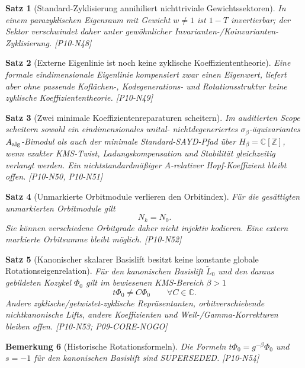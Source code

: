 \documentclass[11pt,a4paper]{amsart}
\newtheorem{theorem}{Satz}[section]
\newtheorem{remark}[theorem]{Bemerkung}
\begin{document}
\begin{theorem}[Standard-Zyklisierung annihiliert nichttriviale
Gewichtssektoren]\label{thm:n48}
In einem parazyklischen Eigenraum mit Gewicht $w\ne1$ ist $1-T$ invertierbar;
der Sektor verschwindet daher unter gewöhnlicher Invarianten-/Koinvarianten-
Zyklisierung. \emph{[P10-N48]}
\end{theorem}

\begin{theorem}[Externe Eigenlinie ist noch keine zyklische
Koeffiziententheorie]\label{thm:n49}
Eine formale eindimensionale Eigenlinie kompensiert zwar einen Eigenwert,
liefert aber ohne passende Koflächen-, Kodegenerations- und Rotationsstruktur
keine zyklische Koeffiziententheorie. \emph{[P10-N49]}
\end{theorem}

\begin{theorem}[Zwei minimale Koeffizientenreparaturen scheitern]
\label{thm:n50n51}
Im auditierten Scope scheitern sowohl ein eindimensionales unital-
nichtdegeneriertes $\sigma_\beta$-äquivariantes $A_{\rm alg}$-Bimodul als auch
der minimale Standard-SAYD-Pfad über $H_\beta=\mathbb C[\mathbb Z]$, wenn
exakter KMS-Twist, Ladungskompensation und Stabilität gleichzeitig verlangt
werden. Ein nichtstandardmäßiger $A$-relativer Hopf-Koeffizient bleibt offen.
\emph{[P10-N50, P10-N51]}
\end{theorem}

\begin{theorem}[Unmarkierte Orbitmodule verlieren den Orbitindex]
\label{thm:n52}
Für die gesättigten unmarkierten Orbitmodule gilt
\[
  N_k=N_0.
\]
Sie können verschiedene Orbitgrade daher nicht injektiv kodieren. Eine extern
markierte Orbitsumme bleibt möglich. \emph{[P10-N52]}
\end{theorem}

\begin{theorem}[Kanonischer skalarer Basislift besitzt keine konstante globale
Rotationseigenrelation]\label{thm:n53}
Für den kanonischen Basislift $\widetilde L_0$ und den daraus gebildeten
Kozykel $\Phi_0$ gilt im bewiesenen KMS-Bereich $\beta>1$
\[
  \boxed{t\Phi_0\ne C\Phi_0\qquad\forall C\in\mathbb C.}
\]
Andere zyklische/getwistet-zyklische Repräsentanten, orbitverschiebende
nichtkanonische Lifts, andere Koeffizienten und Weil-/Gamma-Korrekturen bleiben
offen. \emph{[P10-N53; P09-CORE-NOGO]}
\end{theorem}

\begin{remark}[Historische Rotationsformeln]\label{rem:n54}
Die Formeln $t\Phi_0=g^{-\beta}\Phi_0$ und $s=-1$ für den kanonischen Basislift
sind \emph{SUPERSEDED}. \emph{[P10-N54]}
\end{remark}
\end{document}
